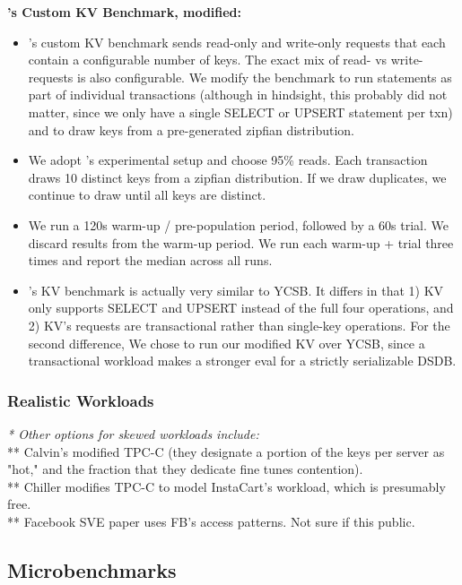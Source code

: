 \textbf{\dsdb{}'s Custom KV Benchmark, modified:}
\begin{itemize}
    \item \dsdb{}'s custom KV benchmark sends read-only and write-only requests that each contain a configurable number of keys. The exact mix of read- vs write-requests is also configurable. We modify the benchmark to run statements as part of individual transactions (although in hindsight, this probably did not matter, since we only have a single SELECT or UPSERT statement per txn) and to draw keys from a pre-generated zipfian distribution.
    \item We adopt \dsdb{}'s experimental setup and choose 95\% reads. Each transaction draws 10 distinct keys from a zipfian distribution. If we draw duplicates, we continue to draw until all keys are distinct.
    \item We run a 120s warm-up / pre-population period, followed by a 60s trial. We discard results from the warm-up period. We run each warm-up + trial three times and report the median across all runs.
    \item \dsdb{}'s KV benchmark is actually very similar to YCSB. It differs in that 1) KV only supports SELECT and UPSERT instead of the full four operations, and 2) KV's requests are transactional rather than single-key operations. For the second difference, We chose to run our modified KV over YCSB, since a transactional workload makes a stronger eval for a strictly serializable DSDB. 
\end{itemize}

\subsubsection{Realistic Workloads}
\textit{* Other options for skewed workloads include:}\\
** Calvin's modified TPC-C (they designate a portion of the keys per server as "hot," and the fraction that they dedicate fine tunes contention).\\
** Chiller modifies TPC-C to model InstaCart's workload, which is presumably free.\\
** Facebook SVE paper uses FB's access patterns. Not sure if this public.\\

\subsection{Microbenchmarks}

